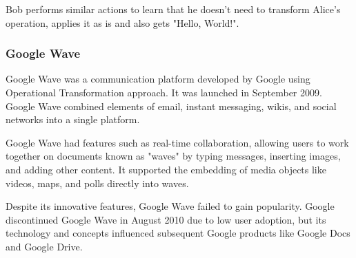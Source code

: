 \documentclass[a4paper, 11pt, oneside]{article}
\theoremstyle{definition}
\begin{document}
Bob performs similar actions to learn that he doesn't need to transform Alice's operation, applies it as is and also gets "Hello, World!".

\subsubsection{Google Wave}

Google Wave \cite{wavewiki,waveyt,waveot} was a communication platform developed by Google using Operational Transformation approach. It was launched in September 2009. Google Wave combined elements of email, instant messaging, wikis, and social networks into a single platform.

Google Wave had features such as real-time collaboration, allowing users to work together on documents known as "waves" by typing messages, inserting images, and adding other content. It supported the embedding of media objects like videos, maps, and polls directly into waves.

Despite its innovative features, Google Wave failed to gain popularity. Google discontinued Google Wave in August 2010 due to low user adoption, but its technology and concepts influenced subsequent Google products like Google Docs and Google Drive.
\end{document}
